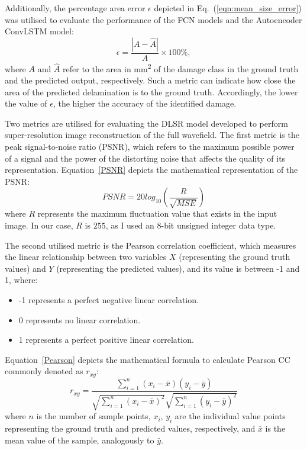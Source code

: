 Additionally, the percentage area error $\epsilon$ depicted in Eq.~(\ref{eqn:mean_size_error}) was utilised to evaluate the performance of the FCN models and the Autoencoder ConvLSTM model:
\begin{equation}
	\epsilon=\frac{|A-\hat{A}|}{A} \times 100\%,
	\label{eqn:mean_size_error}
\end{equation}
where \(A\) and \(\hat{A}\) refer to the area in mm\textsuperscript{2} of the damage class in the ground truth and the predicted output, respectively.
Such a metric can indicate how close the area of the predicted delamination is to the ground truth.
Accordingly, the lower the value of $\epsilon$, the higher the accuracy of the identified damage. 

Two metrics are utilised for evaluating the DLSR model developed to perform super-resolution image reconstruction of the full wavefield.
The first metric is the peak signal-to-noise ratio (PSNR), which refers to the maximum possible power of a signal and the power of the distorting noise that affects the quality of its representation.
Equation~\ref{PSNR} depicts the mathematical representation of the PSNR:
\begin{equation}
	PSNR=20log_{10}\left(\frac{R}{\sqrt{MSE}}\right)
	\label{PSNR}
\end{equation}
where \(R\) represents the maximum fluctuation value that exists in the input image. 
In our case, \(R\) is \(255\), as I used an 8-bit unsigned integer data type.

The second utilised metric is the Pearson correlation coefficient, which measures the linear relationship between two variables \(X\) (representing the ground truth values) and \(Y\) (representing the predicted values), and its value is between -1 and 1, where:
\begin{itemize}
	\item -1 represents a perfect negative linear correlation.
	\item 0 represents no linear correlation.
	\item 1 represents a perfect positive linear correlation.
\end{itemize}
Equation~\ref{Pearson} depicts the mathematical formula to calculate Pearson CC commonly denoted as \(r_{xy}\):
\begin{equation}
	r_{xy} = \frac{\sum_{i=1}^{n}(x_i - \bar{x})(y_i-\bar{y})}{\sqrt{\sum_{i=1}^{n}(x_i - \bar{x})^2}\sqrt{\sum_{i=1}^{n}(y_i - \bar{y})^2}}
	\label{Pearson}
\end{equation}
where \(n\) is the number of sample points, \(x_i\), \(y_i\) are the individual value points representing the ground truth and predicted values, respectively, and \(\bar{x}\) is the mean value of the sample, analogously to \(\bar{y}\).


